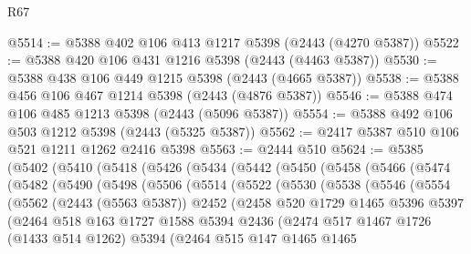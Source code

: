 \begin{lexlean}{R67}
\begin{coremodule}
@5514 := @5388 @402 @106 @413 @1217 @5398 (@2443 (@4270 @5387))
@5522 := @5388 @420 @106 @431 @1216 @5398 (@2443 (@4463 @5387))
@5530 := @5388 @438 @106 @449 @1215 @5398 (@2443 (@4665 @5387))
@5538 := @5388 @456 @106 @467 @1214 @5398 (@2443 (@4876 @5387))
@5546 := @5388 @474 @106 @485 @1213 @5398 (@2443 (@5096 @5387))
@5554 := @5388 @492 @106 @503 @1212 @5398 (@2443 (@5325 @5387))
@5562 := @2417 @5387 @510 @106 @521 @1211 @1262 @2416 @5398
@5563 := @2444 @510
@5624 := @5385
    (@5402
      (@5410
        (@5418
          (@5426
            (@5434
              (@5442
                (@5450
                  (@5458
                    (@5466
                      (@5474
                        (@5482
                          (@5490
                            (@5498
                              (@5506
                                (@5514
                                  (@5522
                                    (@5530
                                      (@5538
                                        (@5546
                                          (@5554
                                            (@5562
                                              (@2443 (@5563 @5387))
                                              @2452
                                              (@2458
                                                @520
                                                @1729
                                                @1465
                                                @5396
                                                @5397
                                                (@2464
                                                  @518
                                                  @163
                                                  @1727
                                                  @1588
                                                  @5394
                                                  @2436
                                                  (@2474
                                                    @517
                                                    @1467
                                                    @1726
                                                    (@1433 @514 @1262)
                                                    @5394
                                                    (@2464
                                                      @515
                                                      @147
                                                      @1465
                                                      @1465

\end{coremodule}
\end{lexlean}
